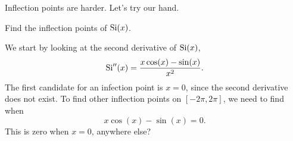 \documentclass{ximera}
\begin{document}
Inflection points are harder. Let's try our hand.

\begin{example}
  Find the inflection points of $\operatorname{Si}(x)$.
  \begin{explanation}
    We start by looking at the second derivative of $\operatorname{Si}(x)$,
    \[
    \operatorname{Si}''(x) = \frac{x\cos(x) -\sin(x)}{x^2}.
    \]
    The first candidate for an infection point is $x=0$, since the
    second derivative does not exist. To find other inflection points
    on $[-2\pi,2\pi]$, we need to find when
    \[
    x\cos(x) -\sin(x) =0.
    \]
    This is zero when $x=0$, anywhere else?
  \end{explanation}
\end{example}
\end{document}

